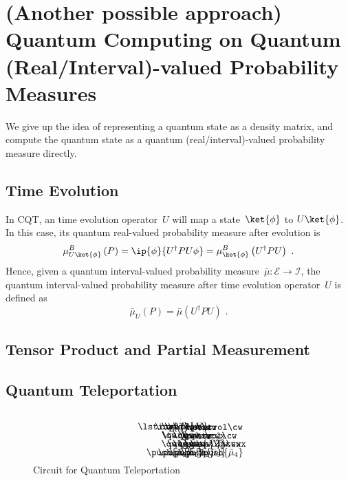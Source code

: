 \documentclass{article}
\theoremstyle{remark}
\newcommand{\events}{\ensuremath{\mathcal{E}}}
\newcommand{\yutsung}[1]{\fbox{\begin{minipage}{0.9\textwidth}\color{purple}{Yu-Tsung says: #1}\end{minipage}}}
\newcommand{\xyC}[1]{\xymatrixcolsep={#1}}
\begin{document}
\section{\label{sec:QC}(Another possible approach) Quantum Computing on Quantum
(Real/Interval)-valued Probability Measures}

We give up the idea of representing a quantum state as a density matrix,
and compute the quantum state as a quantum (real/interval)-valued
probability measure directly. 



\subsection{Time Evolution}

In CQT, an time evolution operator~$U$ will map a state~$\ket{\phi}$
to $U\ket{\phi}$. In this case, its quantum real-valued probability
measure after evolution is
\[
\mu_{U\ket{\phi}}^{B}\left(P\right)=\ip{\phi}{U^{\dagger}PU\phi}=\mu_{\ket{\phi}}^{B}\left(U^{\dagger}PU\right)\textrm{ .}
\]
Hence, given a quantum interval-valued probability measure~$\bar{\mu}:\events\rightarrow\mathscr{I}$,
the quantum interval-valued probability measure after time evolution
operator~$U$ is defined as 
\[
\bar{\mu}_{U}\left(P\right)=\bar{\mu}\left(U^{\dagger}PU\right)\textrm{ .}
\]



\subsection{Tensor Product and Partial Measurement}

\yutsung{Quantum Fubini Theorem?}



\subsection{Quantum Teleportation}

\begin{figure}[t]
\[
\begin{array}{c}
\hspace{1cm}\xyC{.6em}\entrymodifiers={@*=<0em>}\xymatrix@R=0.9em{ & \ar@{.}[dddd] &  & \ar@{.}[dddd] &  & \ar@{.}[dddd] &  & \ar@{.}[dddd]\\
\lstick{\bar{\mu}} & \qw & \ctrl{1} & \qw & \gate{H} & \qw & \meter & \cw & \cw & \control\cw\\
 & \qw & \targ & \qw & \qw & \qw & \meter & \cw & \control\cw & \cwx & \ar@{.}[dd]\\
 & \qw & \qw & \qw & \qw & \qw & \qw & \qw & \gate{X}\cwx & \gate{Z}\cwx & \qw\\
 & \push{\bar{\mu}_{0}} &  & \push{\bar{\mu}_{1}} &  & \push{\bar{\mu}_{2}} &  & \push{\bar{\mu}_{3}} &  &  & \push{\bar{\mu}_{4}}
}
\end{array}
\]
\caption{Circuit for Quantum Teleportation}

\label{fig:QuantumTeleportation} 
\end{figure}


\begin{comment}


\end{comment}

\printbibliography
\end{document}

